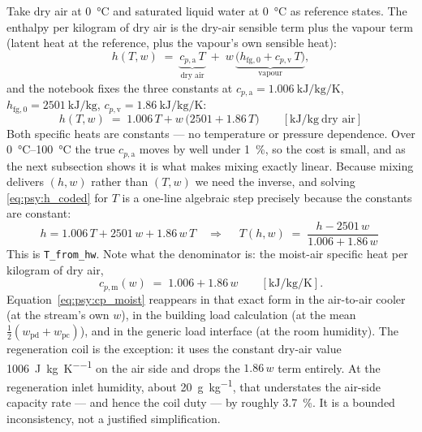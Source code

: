 \documentclass[11pt]{article}
\providecommand{\celsius}{\degreeCelsius}
\begin{document}
Take dry air at \SI{0}{\celsius} and saturated liquid water at \SI{0}{\celsius} as reference states.
The enthalpy per kilogram of dry air is the dry-air sensible term plus the vapour term (latent heat
at the reference, plus the vapour's own sensible heat):
\begin{equation}
h(T,w) \;=\; \underbrace{c_{p,\mathrm{a}}\,T}_{\text{dry air}}
\;+\; w\,\underbrace{\bigl(h_{\mathrm{fg},0} + c_{p,\mathrm{v}}\,T\bigr)}_{\text{vapour}} ,
\label{eq:psy:h_general}
\end{equation}
and the notebook fixes the three constants at $c_{p,\mathrm{a}} =
\SI{1.006}{\kilo\joule\per\kilogram\per\kelvin}$, $h_{\mathrm{fg},0} =
\SI{2501}{\kilo\joule\per\kilogram}$, $c_{p,\mathrm{v}} =
\SI{1.86}{\kilo\joule\per\kilogram\per\kelvin}$:
\begin{equation}
\boxed{\;h(T,w) \;=\; 1.006\,T + w\,\bigl(2501 + 1.86\,T\bigr)
\qquad [\si{\kilo\joule\per\kilogram}\ \text{dry air}]\;} \label{eq:psy:h_coded}
\end{equation}
Both specific heats are constants --- no temperature or pressure dependence. Over
\SIrange{0}{100}{\celsius} the true $c_{p,\mathrm{a}}$ moves by well under \SI{1}{\percent}, so the
cost is small, and as the next subsection shows it is what makes mixing exactly linear. Because
mixing delivers $(h,w)$ rather than $(T,w)$ we need the inverse, and solving \eqref{eq:psy:h_coded}
for $T$ is a one-line algebraic step precisely because the constants are constant:
\begin{equation}
h = 1.006\,T + 2501\,w + 1.86\,w\,T \quad\Longrightarrow\quad
\boxed{\;T(h,w) \;=\; \frac{h - 2501\,w}{1.006 + 1.86\,w}\;} \label{eq:psy:T_from_hw}
\end{equation}
This is \texttt{T\_from\_hw}. Note what the denominator is: the moist-air specific heat per kilogram
of dry air,
\begin{equation}
c_{p,\mathrm{m}}(w) \;=\; 1.006 + 1.86\,w \qquad [\si{\kilo\joule\per\kilogram\per\kelvin}] .
\label{eq:psy:cp_moist}
\end{equation}
Equation~\eqref{eq:psy:cp_moist} reappears in that exact form in the air-to-air cooler (at the
stream's own $w$), in the building load calculation (at the mean $\tfrac12(w_{\mathrm{pd}} +
w_{\mathrm{pc}})$), and in the generic load interface (at the room humidity). The regeneration coil
is the exception: it uses the constant dry-air value \SI{1006}{\joule\per\kilogram\per\kelvin} on
the air side and drops the $1.86\,w$ term entirely. At the regeneration inlet humidity, about
\SI{20}{\gram\per\kilogram}, that understates the air-side capacity rate --- and hence the coil duty
--- by roughly \SI{3.7}{\percent}. It is a bounded inconsistency, not a justified simplification.
\end{document}
